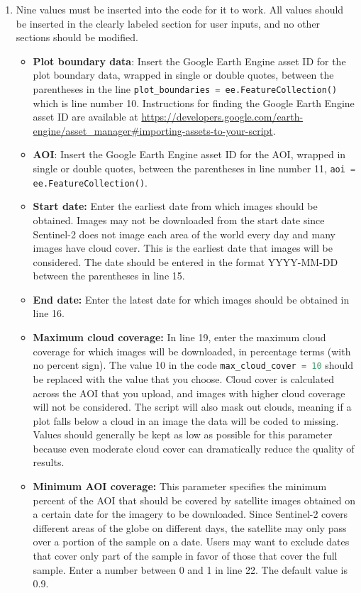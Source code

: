 \documentclass{article}
\begin{document}
\begin{enumerate}
  \item Nine values must be inserted into the code for it to work. All values should be inserted in the clearly labeled section for user inputs, and no other sections should be modified. 
  \begin{itemize}
    \item \textbf{Plot boundary data}: Insert the Google Earth Engine asset ID for the plot boundary data, wrapped in single or double quotes, between the parentheses in the line \lstinline[language=Python]{plot_boundaries = ee.FeatureCollection()} which is line number 10. Instructions for finding the Google Earth Engine asset ID are available at \url{https://developers.google.com/earth-engine/asset_manager#importing-assets-to-your-script}.
    \item \textbf{AOI}: Insert the Google Earth Engine asset ID for the AOI, wrapped in single or double quotes, between the parentheses in line number 11, \lstinline[language=Python]{aoi = ee.FeatureCollection()}.
    \item \textbf{Start date:} Enter the earliest date from which images should be obtained. Images may not be downloaded from the start date since Sentinel-2 does not image each area of the world every day and many images have cloud cover. This is the earliest date that images will be considered. The date should be entered in the format YYYY-MM-DD between the parentheses in line 15. 
    \item \textbf{End date:} Enter the latest date for which images should be obtained in line 16. 
    \item \textbf{Maximum cloud coverage:} In line 19, enter the maximum cloud coverage for which images will be downloaded, in percentage terms (with no percent sign). The value 10 in the code \lstinline[language=Python]{max_cloud_cover = 10} should be replaced with the value that you choose. Cloud cover is calculated across the AOI that you upload, and images with higher cloud coverage will not be considered. The script will also mask out clouds, meaning if a plot falls below a cloud in an image the data will be coded to missing. Values should generally be kept as low as possible for this parameter because even moderate cloud cover can dramatically reduce the quality of results. 
    \item \textbf{Minimum AOI coverage:} This parameter specifies the minimum percent of the AOI that should be covered by satellite images obtained on a certain date for the imagery to be downloaded. Since Sentinel-2 covers different areas of the globe on different days, the satellite may only pass over a portion of the sample on a date. Users may want to exclude dates that cover only part of the sample in favor of those that cover the full sample. Enter a number between 0 and 1 in line 22. The default value is 0.9.

\end{itemize}
\end{enumerate}
\end{document}

